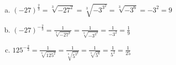 \documentclass[a4paper,14pt]{article}
\begin{document}
\begin{multicols}{2}
\begin{enumerate}
\begin{enumerate}[a)]
        	\item $(-27)^\frac{2}{3} = \sqrt[3]{-27^2} = \sqrt[3]{-3^{3^2}} = \sqrt[3]{-3^6} = -3^2 = 9$ \\
        	\item $(-27)^{-\frac{2}{3}} = \frac{1}{\sqrt[3]{-27^2}} = \frac{1}{\sqrt[3]{-3^{3^2}}} = \frac{1}{-3^2} = \frac{1}{9}$ \\
        	\item $125^{-\frac{2}{3}} = \frac{1}{\sqrt[3]{125^2}} = \frac{1}{\sqrt[3]{5^{3^2}}} = \frac{1}{\sqrt[3]{5^6}} = \frac{1}{5^2} = \frac{1}{25}$ \\
        \end{enumerate}
    \end{enumerate}        
    \end{multicols}    
\end{document}
